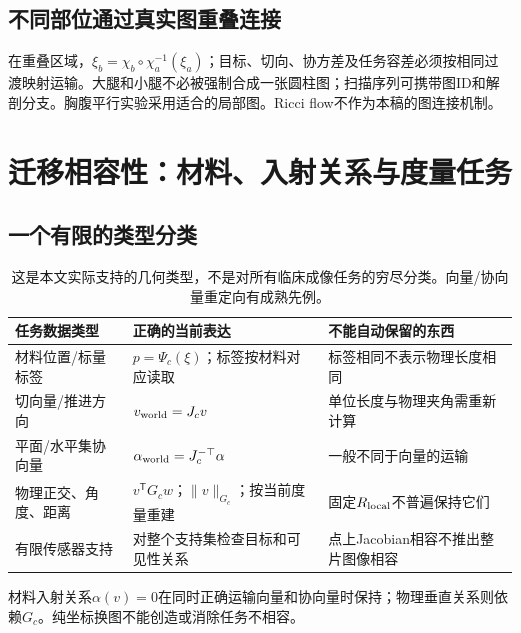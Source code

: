 \documentclass[UTF8,11pt,a4paper,fontset=fandol]{ctexart}
\numberwithin{equation}{section}
\theoremstyle{definition}
\newcommand{\T}{^{\mathsf T}}
\begin{document}
\subsection{不同部位通过真实图重叠连接}
在重叠区域，$\xi_b=\chi_b\circ\chi_a^{-1}(\xi_a)$；目标、切向、协方差及任务容差必须按相同过渡映射运输。大腿和小腿不必被强制合成一张圆柱图；扫描序列可携带图ID和解剖分支。胸腹平行实验采用适合的局部图。Ricci flow不作为本稿的图连接机制。

\section{迁移相容性：材料、入射关系与度量任务}
\subsection{一个有限的类型分类}
\begin{table}[H]\centering\small
\begin{tabularx}{\textwidth}{p{28mm}YY}\toprule
任务数据类型 & 正确的当前表达 & 不能自动保留的东西\\\midrule
材料位置/标量标签 & $p=\Psi_c(\xi)$；标签按材料对应读取 & 标签相同不表示物理长度相同\\
切向量/推进方向 & $v_{\rm world}=J_cv$ & 单位长度与物理夹角需重新计算\\
平面/水平集协向量 & $\alpha_{\rm world}=J_c^{-\top}\alpha$ & 一般不同于向量的运输\\
物理正交、角度、距离 & $v\T G_cw$；$\|v\|_{G_c}$；按当前度量重建 & 固定$R_{\rm local}$不普遍保持它们\\
有限传感器支持 & 对整个支持集检查目标和可见性关系 & 点上Jacobian相容不推出整片图像相容\\\bottomrule
\end{tabularx}
\caption{这是本文实际支持的几何类型，不是对所有临床成像任务的穷尽分类。向量/协向量重定向有成熟先例\cite{alexander2001}。}
\end{table}
材料入射关系$\alpha(v)=0$在同时正确运输向量和协向量时保持；物理垂直关系则依赖$G_c$。纯坐标换图不能创造或消除任务不相容。
\end{document}
